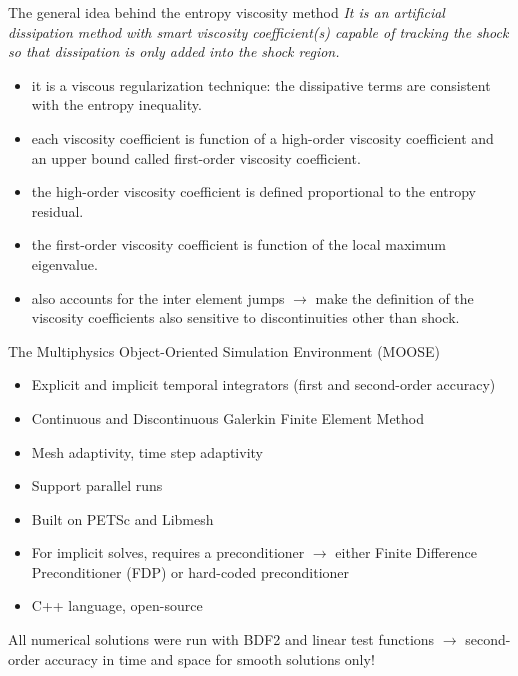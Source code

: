 \documentclass[xcolor=dvipsnames,10pt]{beamer}
\newcommand{\tcr}[1]{\textcolor{red}{#1}}
\begin{document}
\begin{frame}{The general idea behind the entropy viscosity method}
\emph{It is an artificial dissipation method with smart viscosity coefficient(s)  capable of tracking the shock so that dissipation is only added into the shock region.}
\begin{block}{}
\begin{itemize}
\setlength{\itemsep}{10pt}
\item it is a viscous regularization technique: the dissipative terms are consistent with the entropy inequality. 
\item each viscosity coefficient is function of a high-order viscosity coefficient and an upper bound called first-order viscosity coefficient.
\item the high-order viscosity coefficient is defined proportional to the entropy residual.
\item the first-order viscosity coefficient is function of the local maximum eigenvalue.
\item also accounts for the inter element jumps $\to$ make the definition of the viscosity coefficients also sensitive to discontinuities other than shock. 
\end{itemize}
\end{block}
\end{frame}
\begin{frame}{The Multiphysics Object-Oriented Simulation Environment (MOOSE)}
\begin{block}{}
\begin{itemize}
\setlength{\itemsep}{10pt}
\item Explicit and implicit temporal integrators (first and second-order accuracy)
\item Continuous and Discontinuous Galerkin Finite Element Method
\item Mesh adaptivity, time step adaptivity
\item Support parallel runs
\item Built on PETSc and Libmesh
\item For implicit solves, requires a preconditioner $\to$ either Finite Difference Preconditioner (FDP) 
or hard-coded preconditioner
\item C++ language, open-source
\end{itemize}
\end{block}
\begin{block}{}
All numerical solutions were run with BDF2 and linear test functions $\to$ second-order accuracy in time and space for smooth solutions only!
\end{block}
\end{frame}
\end{document}
